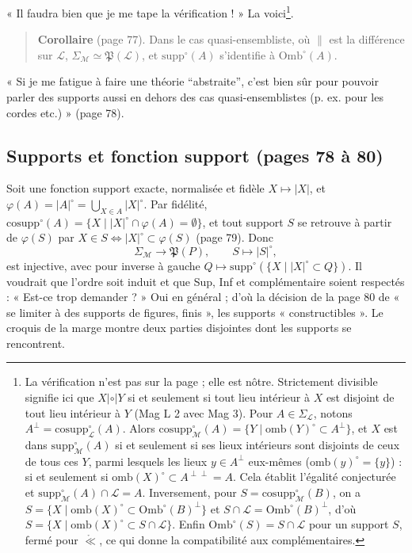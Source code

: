\documentclass[11pt,a4paper]{article}
\begin{document}
« Il faudra bien que je me tape la vérification ! » La voici\footnote{La
vérification n'est pas sur la page ; elle est nôtre. Strictement divisible
signifie ici que $X \mathrel{|\circ|} Y$ si et seulement si tout lieu intérieur
à $X$ est disjoint de tout lieu intérieur à $Y$ (Mag L 2 avec Mag 3). Pour $A
\in \Sigma_{\mathcal{L}}$, notons $A^{\perp} = \mathrm{cosupp}^{\circ}_{\mathcal{L}}(A)$.
Alors $\mathrm{cosupp}^{\circ}_{\mathcal{M}}(A) = \{Y \mid
\mathrm{omb}(Y)^{\circ} \subset A^{\perp}\}$, et $X$ est dans
$\mathrm{supp}^{\circ}_{\mathcal{M}}(A)$ si et seulement si ses lieux intérieurs
sont disjoints de ceux de tous ces $Y$, parmi lesquels les lieux $y \in
A^{\perp}$ eux-mêmes ($\mathrm{omb}(y)^{\circ} = \{y\}$) : si et seulement si
$\mathrm{omb}(X)^{\circ} \subset A^{\perp\perp} = A$. Cela établit l'égalité
conjecturée et $\mathrm{supp}^{\circ}_{\mathcal{M}}(A) \cap \mathcal{L} = A$.
Inversement, pour $S = \mathrm{cosupp}^{\circ}_{\mathcal{M}}(B)$, on a $S = \{X
\mid \mathrm{omb}(X)^{\circ} \subset \mathrm{Omb}^{\circ}(B)^{\perp}\}$ et $S
\cap \mathcal{L} = \mathrm{Omb}^{\circ}(B)^{\perp}$, d'où $S = \{X \mid
\mathrm{omb}(X)^{\circ} \subset S \cap \mathcal{L}\}$. Enfin
$\mathrm{Omb}^{\circ}(S) = S \cap \mathcal{L}$ pour un support $S$, fermé pour
$\mathring{\ll}$, ce qui donne la compatibilité aux complémentaires.}.

\begin{quote}
\textbf{Corollaire} (page 77). Dans le cas quasi-ensembliste, où $\parallel$ est
la différence sur $\mathcal{L}$, $\Sigma_{\mathcal{M}} \simeq
\mathfrak{P}(\mathcal{L})$, et $\mathrm{supp}^{\circ}(A)$ s'identifie à
$\mathrm{Omb}^{\circ}(A)$.
\end{quote}

« Si je me fatigue à faire une théorie “abstraite”, c'est bien sûr pour
pouvoir parler des supports aussi en dehors des cas quasi-ensemblistes (p. ex.
pour les cordes etc.) » (page 78).

\subsection*{Supports et fonction support (pages 78 à 80)}

Soit une fonction support exacte, normalisée et fidèle $X \mapsto |X|$, et
$\varphi(A) = |A|^{\circ} = \bigcup_{X \in A} |X|^{\circ}$. Par fidélité,
$\mathrm{cosupp}^{\circ}(A) = \{X \mid |X|^{\circ} \cap \varphi(A) =
\emptyset\}$, et tout support $S$ se retrouve à partir de $\varphi(S)$ par $X
\in S \iff |X|^{\circ} \subset \varphi(S)$ (page 79). Donc
\[
\Sigma_{\mathcal{M}} \longrightarrow \mathfrak{P}(P), \qquad S \longmapsto
|S|^{\circ},
\]
est injective, avec pour inverse à gauche $Q \mapsto
\mathrm{supp}^{\circ}(\{X \mid |X|^{\circ} \subset Q\})$. Il voudrait que
l'ordre soit induit et que Sup, Inf et complémentaire soient respectés : « Est-ce
trop demander ? » Oui en général ; d'où la décision de la page 80 de « se
limiter à des supports de figures, finis », les supports « constructibles ».
Le croquis de la marge montre deux parties disjointes dont les supports se
rencontrent.
\end{document}
